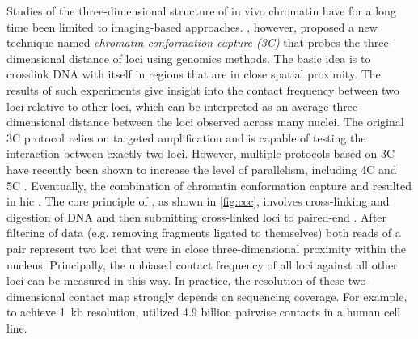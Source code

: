 Studies of the three-dimensional structure of in vivo chromatin have for a long
time been limited to imaging-based approaches. \cite{Dekker2002}, however,
proposed a new technique named \emph{chromatin conformation capture (3C)} that
probes the three-dimensional distance of loci using genomics methods. The basic
idea is to crosslink DNA with itself in regions that are in close spatial
proximity. The results of such experiments give insight into the contact
frequency between two loci relative to other loci, which can be interpreted as
an average three-dimensional distance between the loci observed across many
nuclei. The original 3C protocol relies on targeted \pcr amplification and is
capable of testing the interaction between exactly two loci. However, multiple
protocols based on 3C have recently been shown to increase the level of
parallelism, including 4C \citep{Zhao2006,Simonis2006} and 5C \citep{Dostie2006}.
Eventually, the combination of chromatin conformation capture and \mps resulted
in \acf{hic} \citep{Lieberman-Aiden2009}. The core principle of \hic, as shown
in \cref{fig:ccc}, involves cross-linking and digestion of DNA and then
submitting cross-linked loci to paired-end \mps. After filtering of data (e.g.
removing fragments ligated to themselves) both reads of a pair represent two
loci that were in close three-dimensional proximity within the nucleus.
Principally, the unbiased contact frequency of all loci against all other loci
can be measured in this way. In practice, the resolution of these two-dimensional
contact map strongly depends on sequencing coverage. For example, to achieve
1~kb resolution, \cite{Rao2014} utilized 4.9 billion pairwise contacts in a
human cell line.


